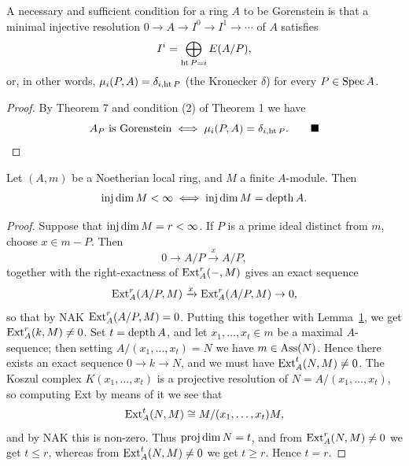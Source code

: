\begin{theorem}\label{thm:18.8}
A necessary and sufficient condition for a ring $A$ to be
Gorenstein is that a minimal injective resolution $0 \to A \to I^0 \to
I^1 \to \cdots$ of $A$ satisfies
\[
  I^i = \bigoplus_{\operatorname{ht} P = i} E(A/P),
\]
or, in other words, $\mu_i(P, A) = \delta_{i,\operatorname{ht} P}$ (the Kronecker $\delta$) for every $P \in \operatorname{Spec} A$.
\end{theorem}

\begin{proof}
By Theorem 7 and condition (2) of Theorem 1 we have
\[
  A_P \text{ is Gorenstein} \iff \mu_i(P, A) = \delta_{i,\operatorname{ht} P}. \qquad\blacksquare
\]
\end{proof}

\begin{theorem}\label{thm:18.9}
Let $(A, m)$ be a Noetherian local ring, and $M$ a finite
$A$-module. Then
\[
  \operatorname{inj\,dim} M < \infty \iff \operatorname{inj\,dim} M = \operatorname{depth} A.
\]
\end{theorem}

\begin{proof}
Suppose that $\operatorname{inj\,dim} M = r < \infty$. If $P$ is a prime ideal distinct from
$m$, choose $x \in m - P$. Then
\[
  0 \to A/P \xrightarrow{x} A/P,
\]
together with the right-exactness of $\operatorname{Ext}^r_A(-, M)$ gives an exact sequence
\[
  \operatorname{Ext}^r_A(A/P, M) \xrightarrow{x} \operatorname{Ext}^r_A(A/P, M) \to 0,
\]
so that by NAK $\operatorname{Ext}^r_A(A/P, M) = 0$. Putting this together with Lemma~\hyperref[lem:18.1]{1},
we get $\operatorname{Ext}^r_A(k, M) \neq 0$. Set $t = \operatorname{depth} A$, and let $x_1, \ldots, x_t \in m$ be a
maximal $A$-sequence; then setting $A/(x_1, \ldots, x_t) = N$ we have $m \in \operatorname{Ass}(N)$.
Hence there exists an exact sequence $0 \to k \to N$, and we must have
$\operatorname{Ext}^t_A(N, M) \neq 0$. The Koszul complex $K(x_1, \ldots, x_t)$ is a projective resolution
of $N = A/(x_1, \ldots, x_t)$, so computing Ext by means of it we see that
\[
  \operatorname{Ext}^t_A(N, M) \cong M/(x_1, \ldots, x_t)M,
\]
and by NAK this is non-zero. Thus $\operatorname{proj\,dim} N = t$, and from $\operatorname{Ext}^r_A(N, M) \neq
0$ we get $t \le r$, whereas from $\operatorname{Ext}^t_A(N, M) \neq 0$ we get $t \ge r$. Hence $t = r$.
\end{proof}

